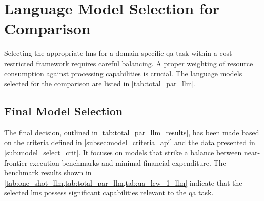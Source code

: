 \section{Language Model Selection for Comparison}\label{sec:results_model_selection}

Selecting the appropriate \acp{lm} for a domain-specific \ac{qa} task within a cost-restricted framework requires careful balancing.
A proper weighting of resource consumption against processing capabilities is crucial.
The language models selected for the comparison are listed in \cref{tab:total_par_llm}.
%
\subsection{Final Model Selection}\label{subsec:reasoning_model}

The final decision, outlined in \cref{tab:total_par_llm_results}, has been made based on the criteria defined in \cref{subsec:model_criteria_api} and the data presented in \cref{sub:model_select_crit}.
It focuses on models that strike a balance between near-frontier execution benchmarks and minimal financial expenditure.
The benchmark results shown in \cref{tab:one_shot_llm,tab:total_par_llm,tab:qa_lcw_1_llm} indicate that the selected \acp{lm} possess significant capabilities relevant to the \ac{qa} task.

